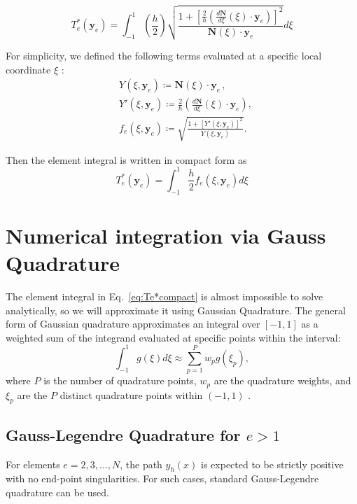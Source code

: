 \documentclass[11pt]{article}
\begin{document}
\[ 
    T_e^*(\mathbf{y}_e) = \int_{-1}^{1}\left(\frac{h}{2}\right) \sqrt{\frac{1 + \left[ \frac{2}{h} \left( \frac{d\mathbf{N}}{d\xi}(\xi) \cdot \mathbf{y}_e \right)  \right]^2}{\mathbf{N}(\xi) \cdot \mathbf{y}_e}}  d\xi
\]

For simplicity, we defined the following terms evaluated at a specific local coordinate \( \xi \) :  
\begin{align}
    &Y(\xi, \mathbf{y}_e) \coloneqq \mathbf{N}(\xi) \cdot \mathbf{y}_e \, , \\ 
    &Y'(\xi, \mathbf{y}_e) \coloneqq \frac{2}{h} \left( \frac{d\mathbf{N}}{d\xi}(\xi) \cdot \mathbf{y}_e \right) , \\ 
    &f_e(\xi, \mathbf{y}_e) \coloneqq \sqrt{\frac{1 + [Y'(\xi, \mathbf{y}_e)]^2}{Y(\xi, \mathbf{y}_e)}}. \label{eq:fe}
\end{align}

Then the element integral is written in compact form as  
\begin{equation}
    T_e^*(\mathbf{y}_e) = \int_{-1}^{1}  \frac{h}{2} f_e(\xi, \mathbf{y}_e) d\xi \label{eq:Te*compact}
\end{equation}

\section{Numerical integration via Gauss Quadrature}
The element integral in Eq.~\eqref{eq:Te*compact} is almost impossible to solve analytically, so we will approximate it using Gaussian Quadrature. The general form of Gaussian quadrature approximates an integral over \( \left[-1,1\right] \) as a weighted sum of the integrand evaluated at specific points within the interval:  
\[ 
    \int_{-1}^{1} g(\xi) d\xi \approx \sum_{p=1}^{P} w_p g(\xi_p) ,
\]
where \(P\) is the number of quadrature points, \(w_p\) are the quadrature weights, and \(\xi_p\) are the \( P \) distinct quadrature points within \( \left(-1,1\right) \) .

\subsection{Gauss-Legendre Quadrature for \( e > 1 \) }

For elements \( e = 2, 3, ..., N \), the path \(y_h(x) \)  is expected to be strictly positive with no end-point singularities. For such cases, standard Gauss-Legendre quadrature can be used. 
\end{document}
